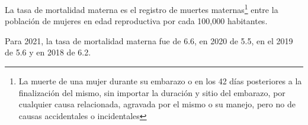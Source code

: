 La tasa de mortalidad materna es el registro de muertes maternas\footnote{La muerte de una mujer durante su embarazo o en los 42 días posteriores a la finalización del mismo, sin importar la duración y sitio del embarazo, por cualquier causa relacionada, agravada por el mismo o su manejo, pero no de causas accidentales o incidentales} entre la población de mujeres en edad reproductiva por cada 100,000 habitantes. 

Para 2021, la tasa de mortalidad materna fue de 6.6, en 2020 de 5.5, en el 2019 de 5.6 y en 2018 de 6.2. 